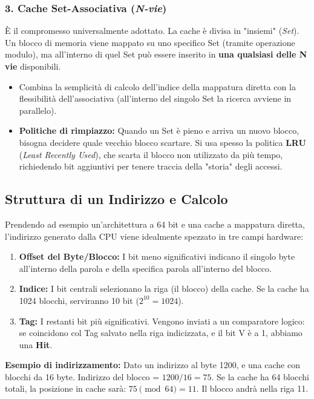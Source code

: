 \documentclass[12pt, a4paper]{article}
\begin{document}
\subsubsection{3. Cache Set-Associativa (\textit{N-vie})}
È il compromesso universalmente adottato. La cache è divisa in "insiemi" (\textit{Set}). Un blocco di memoria viene mappato su uno specifico Set (tramite operazione modulo), ma all'interno di quel Set può essere inserito in \textbf{una qualsiasi delle N vie} disponibili.
\begin{itemize}
    \item Combina la semplicità di calcolo dell'indice della mappatura diretta con la flessibilità dell'associativa (all'interno del singolo Set la ricerca avviene in parallelo).
    \item \textbf{Politiche di rimpiazzo:} Quando un Set è pieno e arriva un nuovo blocco, bisogna decidere quale vecchio blocco scartare. Si usa spesso la politica \textbf{LRU} (\textit{Least Recently Used}), che scarta il blocco non utilizzato da più tempo, richiedendo bit aggiuntivi per tenere traccia della "storia" degli accessi.
\end{itemize}

\subsection{Struttura di un Indirizzo e Calcolo}
Prendendo ad esempio un'architettura a 64 bit e una cache a mappatura diretta, l'indirizzo generato dalla CPU viene idealmente spezzato in tre campi hardware:
\begin{enumerate}
    \item \textbf{Offset del Byte/Blocco:} I bit meno significativi indicano il singolo byte all'interno della parola e della specifica parola all'interno del blocco.
    \item \textbf{Indice:} I bit centrali selezionano la riga (il blocco) della cache. Se la cache ha 1024 blocchi, serviranno 10 bit ($2^{10} = 1024$).
    \item \textbf{Tag:} I restanti bit più significativi. Vengono inviati a un comparatore logico: se coincidono col Tag salvato nella riga indicizzata, e il bit V è a 1, abbiamo una \textbf{Hit}.
\end{enumerate}

\textbf{Esempio di indirizzamento:} 
Dato un indirizzo al byte 1200, e una cache con blocchi da 16 byte. 
Indirizzo del blocco = $1200 / 16 = 75$. 
Se la cache ha 64 blocchi totali, la posizione in cache sarà: $75 \pmod{64} = 11$. Il blocco andrà nella riga 11.
\end{document}
